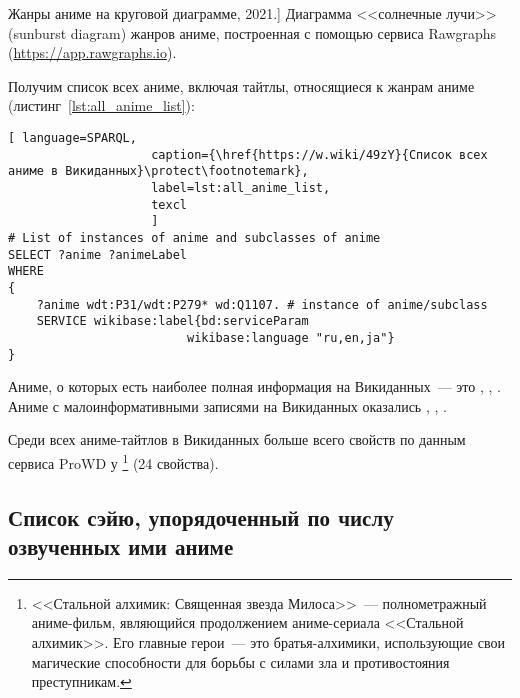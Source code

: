 \begin{marginfigure}[0.0cm]
{
	\setlength{\fboxsep}{0pt}%
	\setlength{\fboxrule}{1pt}%
}
\caption
[Жанры аниме на круговой диаграмме, 2021.]
{
Диаграмма <<солнечные лучи>> (sunburst diagram) жанров аниме, построенная с помощью сервиса Rawgraphs (\href{https://app.rawgraphs.io}{https://app.rawgraphs.io}).\newline
}
\label{fig:anime_piechart}
\end{marginfigure}

Получим список всех аниме, включая тайтлы, относящиеся к жанрам аниме (листинг~\protect\ref{lst:all_anime_list}):

\begin{lstlisting}[ language=SPARQL, 
                    caption={\href{https://w.wiki/49zY}{Список всех аниме в Викиданных}\protect\footnotemark},
                    label=lst:all_anime_list,
                    texcl 
                    ]
# List of instances of anime and subclasses of anime
SELECT ?anime ?animeLabel
WHERE
{
    ?anime wdt:P31/wdt:P279* wd:Q1107. # instance of anime/subclass
    SERVICE wikibase:label{bd:serviceParam
					     wikibase:language "ru,en,ja"}
}
\end{lstlisting}%

Аниме, о которых есть наиболее полная информация на Викиданных~--- это , , . Аниме с малоинформативными записями на Викиданных оказались , , .

Среди всех аниме-тайтлов в Викиданных больше всего свойств по данным сервиса ProWD\autocite{anime_prowd} у \footnote{<<Стальной алхимик: Священная звезда Милоса>>~--- полнометражный аниме-фильм, являющийся продолжением аниме-сериала <<Стальной алхимик>>. Его главные герои~--- это братья-алхимики, использующие свои магические способности для борьбы с силами зла и противостояния преступникам.} (24 свойства).

\subsection{Список сэйю, упорядоченный по числу озвученных ими аниме}

